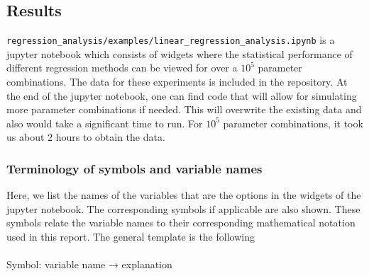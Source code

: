 \subsection{Results} \label{subsec:results_linear_regression}

\texttt{regression\_analysis/examples/linear\_regression\_analysis.ipynb} is a jupyter notebook which consists of widgets where the statistical performance of different regression methods can be viewed for over a $10^5$ parameter combinations. The data for these experiments is included in the repository. At the end of the jupyter notebook, one can find code that will allow for simulating more parameter combinations if needed. This will overwrite the existing data and also would take a significant time to run. For $10^5$ parameter combinations, it took us about $2$ hours to obtain the data.

\subsubsection{Terminology of symbols and variable names}
Here, we list the names of the variables that are the options in the widgets of the jupyter notebook. The corresponding symbols if applicable are also shown. These symbols relate the variable names to their corresponding mathematical notation used in this report. The general template is the following \\
\\
Symbol: variable name → explanation

